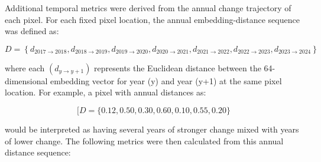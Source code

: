 \documentclass[11pt,a4paper]{article}
\begin{document}
Additional temporal metrics were derived from the annual change trajectory of each pixel. For each fixed pixel location, the annual embedding-distance sequence was defined as:

\[
D=
\left\{
d_{2017\rightarrow2018},
d_{2018\rightarrow2019},
d_{2019\rightarrow2020},
d_{2020\rightarrow2021},
d_{2021\rightarrow2022},
d_{2022\rightarrow2023},
d_{2023\rightarrow2024}
\right\}
\]

where each $(d_{y\rightarrow y+1})$ represents the Euclidean distance between the 64-dimensional embedding vector for year (y) and year (y+1) at the same pixel location. For example, a pixel with annual distances as:

\[[D = \{0.12, 0.50, 0.30, 0.60, 0.10, 0.55, 0.20\}\]

would be interpreted as having several years of stronger change mixed with years of lower change. The following metrics were then calculated from this annual distance sequence:
\end{document}

